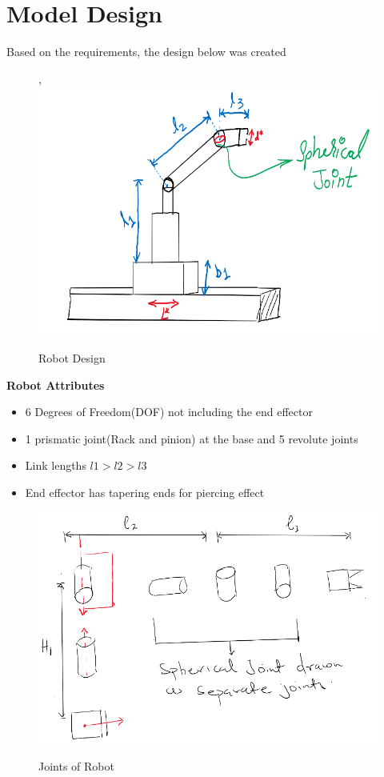 \documentclass[12pt]{article}
\begin{document}
\section{Model Design}
 Based on the requirements, the design below was created
\begin{figure}[H],
    \centering
    \includegraphics[scale = 1.1]{design.png}\\[0.0 cm]	%
    \caption{Robot Design} 
\end{figure}
\textbf{Robot Attributes}
\begin{itemize}
  \item 6 Degrees of Freedom(DOF) not including the end effector 
  \item 1 prismatic joint(Rack and pinion) at the base and 5 revolute joints 
  \item Link lengths $l1>l2>l3$
  \item End effector has tapering ends for piercing effect 
\end{itemize}

\begin{figure}[H]
    \centering
    \includegraphics[scale = 1.1]{joints.png}\\[0.0 cm]	%
    \caption{Joints of Robot} 
\end{figure}
\end{document}
